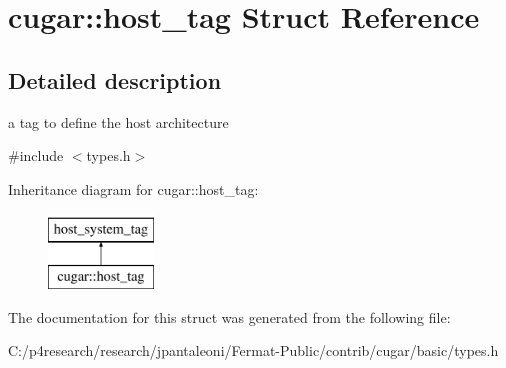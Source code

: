 \hypertarget{structcugar_1_1host__tag}{}\section{cugar\+:\+:host\+\_\+tag Struct Reference}
\label{structcugar_1_1host__tag}


\subsection{Detailed description}
a tag to define the host architecture 

{\ttfamily \#include $<$types.\+h$>$}

Inheritance diagram for cugar\+:\+:host\+\_\+tag\+:\begin{figure}[H]
\begin{center}
\leavevmode
\includegraphics[height=2.000000cm]{structcugar_1_1host__tag}
\end{center}
\end{figure}


The documentation for this struct was generated from the following file\+:\begin{DoxyCompactItemize}
\item 
C\+:/p4research/research/jpantaleoni/\+Fermat-\/\+Public/contrib/cugar/basic/types.\+h\end{DoxyCompactItemize}
